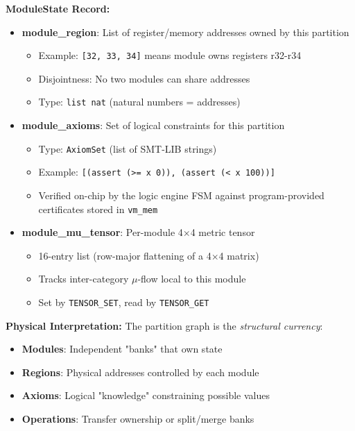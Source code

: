 \textbf{ModuleState Record:}
\begin{itemize}
    \item \textbf{module\_region}: List of register/memory addresses owned by this partition
    \begin{itemize}
        \item Example: \texttt{[32, 33, 34]} means module owns registers r32-r34
        \item Disjointness: No two modules can share addresses
        \item Type: \texttt{list nat} (natural numbers = addresses)
    \end{itemize}
    \item \textbf{module\_axioms}: Set of logical constraints for this partition
    \begin{itemize}
        \item Type: \texttt{AxiomSet} (list of SMT-LIB strings)
        \item Example: \texttt{[(assert (>= x 0)), (assert (< x 100))]}
        \item Verified on-chip by the logic engine FSM against program-provided certificates stored in \texttt{vm\_mem}
    \end{itemize}
    \item \textbf{module\_mu\_tensor}: Per-module 4$\times$4 metric tensor
    \begin{itemize}
        \item 16-entry list (row-major flattening of a 4$\times$4 matrix)
        \item Tracks inter-category $\mu$-flow local to this module
        \item Set by \texttt{TENSOR\_SET}, read by \texttt{TENSOR\_GET}
    \end{itemize}
\end{itemize}

\textbf{Physical Interpretation:} The partition graph is the \emph{structural currency}:
\begin{itemize}
    \item \textbf{Modules}: Independent "banks" that own state
    \item \textbf{Regions}: Physical addresses controlled by each module
    \item \textbf{Axioms}: Logical "knowledge" constraining possible values
    \item \textbf{Operations}: Transfer ownership or split/merge banks
\end{itemize}

